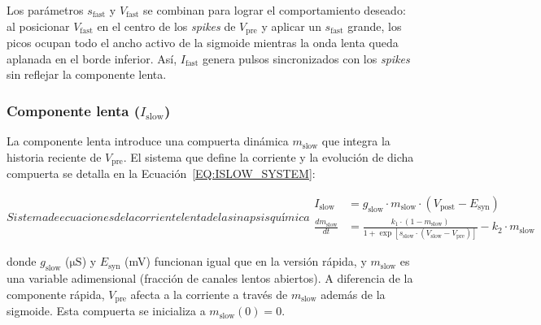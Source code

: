 Los parámetros \(s_{\mathrm{fast}}\) y \(V_{\mathrm{fast}}\) se combinan para lograr el comportamiento deseado: al posicionar \(V_{\mathrm{fast}}\) en el centro de los \textit{spikes} de \(V_{\mathrm{pre}}\) y aplicar un \(s_{\mathrm{fast}}\) grande, los picos ocupan todo el ancho activo de la sigmoide mientras la onda lenta queda aplanada en el borde inferior. Así, \(I_{\mathrm{fast}}\) genera pulsos sincronizados con los \textit{spikes} sin reflejar la componente lenta.

\subsubsection{Componente lenta (\(I_{\mathrm{slow}}\))}

La componente lenta introduce una compuerta dinámica \(m_{\mathrm{slow}}\) que integra la historia reciente de \(V_{\mathrm{pre}}\). El sistema que define la corriente y la evolución de dicha compuerta se detalla en la Ecuación~\ref{EQ:ISLOW_SYSTEM}:

\begin{equation}[EQ:ISLOW_SYSTEM]{Sistema de ecuaciones de la corriente lenta de la sinapsis química}
    \boxed{
        \begin{aligned}
            I_{\mathrm{slow}}              & = g_{\mathrm{slow}} \cdot m_{\mathrm{slow}} \cdot (V_{\mathrm{post}} - E_{\mathrm{syn}})                                                             \\
            \frac{d m_{\mathrm{slow}}}{dt} & = \frac{k_1 \cdot (1 - m_{\mathrm{slow}})}{1 + \exp[ s_{\mathrm{slow}} \cdot (V_{\mathrm{slow}} - V_{\mathrm{pre}}) ]} - k_2 \cdot m_{\mathrm{slow}}
        \end{aligned}
    }
\end{equation}

\noindent donde \(g_{\mathrm{slow}}\) (\(\mathrm{\mu S}\)) y \(E_{\mathrm{syn}}\) (mV) funcionan igual que en la versión rápida, y \(m_{\mathrm{slow}}\) es una variable adimensional (fracción de canales lentos abiertos). A diferencia de la componente rápida, \(V_{\mathrm{pre}}\) afecta a la corriente a través de \(m_{\mathrm{slow}}\) además de la sigmoide. Esta compuerta se inicializa a \(m_{\mathrm{slow}}(0) = 0\).

